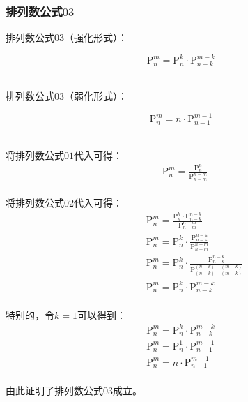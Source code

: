 \documentclass[UTF8]{ctexart}
\newcommand{\Pe}{\mathrm{P}}
\begin{document}
\subsubsection{排列数公式$03$}
    排列数公式$03$（强化形式）：
    \begin{large}
        \begin{equation*}
            \Pe_n^m=\Pe_n^k\cdot\Pe_{n-k}^{m-k}
        \end{equation*}
    \end{large}\\
    排列数公式$03$（弱化形式）：
    \begin{large}
        \begin{equation*}
            \Pe_n^m=n\cdot\Pe_{n-1}^{m-1}
        \end{equation*}
    \end{large}\\
    将排列数公式$01$代入可得：
    \setcounter{equation}{0}
    \begin{align}
        &\Pe_n^m=\frac{\Pe_n^n}{\Pe_{n-m}^{n-m}}
    \end{align}\\
    将排列数公式$02$代入可得：
    \begin{align}
        &~~~~~~~~~\Pe_n^m=\frac{\Pe_n^k\cdot\Pe_{n-k}^{n-k}}{\Pe_{n-m}^{n-m}}\\[3mm]
        &~~~~~~~~~\Pe_n^m=\Pe_n^k\cdot\frac{\Pe_{n-k}^{n-k}}{\Pe_{n-m}^{n-m}}\\[3mm]
        &~~~~~~~~~\Pe_n^m=\Pe_n^k\cdot\frac{\Pe_{n-k}^{n-k}}{\Pe_{(n-k)-(m-k)}^{(n-k)-(m-k)}}\\[3mm]
        &~~~~~~~~~\Pe_n^m=\Pe_n^k\cdot\Pe_{n-k}^{m-k}
    \end{align}\\
    特别的，令$k=1$可以得到：
    \begin{align}
        &\Pe_n^m=\Pe_n^k\cdot\Pe_{n-k}^{m-k}~~~~\\[3mm]
        &\Pe_n^m=\Pe_n^1\cdot\Pe_{n-1}^{m-1}\\[3mm]
        &\Pe_n^m=n\cdot\Pe_{n-1}^{m-1}
    \end{align}\\
    由此证明了排列数公式$03$成立。

\newpage
\end{document}
